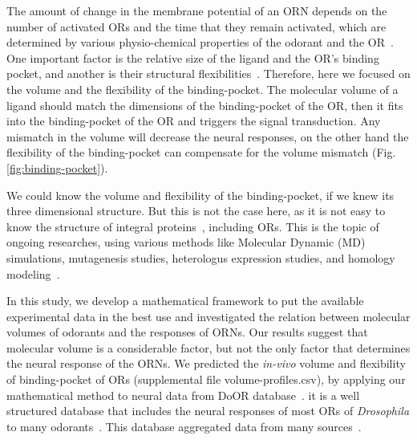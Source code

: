 \documentclass[11pt]{paper} %
\begin{document}

The amount of change in the membrane potential of an ORN depends on the number of activated ORs and the time that they remain activated,
which are determined by various physio-chemical properties of the odorant and the OR~\cite{Turin,Araneda2000,Gabler2013,guerrieri2005,uchida2000}.
One important factor is the relative size of the ligand and the OR's binding pocket, 
and another is their structural flexibilities~\cite{liang1998anatomy,apostolakis1998docking,gunasekaran2007different}. 
Therefore, here we focused on the volume and the flexibility of the binding-pocket.
The molecular volume of a ligand should match the dimensions of the binding-pocket of the OR,
then it fits into the binding-pocket of the OR and triggers the signal transduction. 
Any mismatch in the volume will decrease the neural responses, 
on the other hand the flexibility of the binding-pocket can compensate for the volume mismatch (Fig. \ref{fig:binding-pocket}).

We could know the volume and flexibility of the binding-pocket, 
if we knew its three dimensional structure.
But this is not the case here, 
as it is not easy to know the structure of integral proteins~\cite{Zhang2008,Lupieri2009}, 
including ORs. 
This is the topic of ongoing researches, 
using various methods like Molecular Dynamic (MD) simulations, 
mutagenesis studies, heterologus expression studies, and homology modeling~\cite{Khafizov2007,Man2004,Lai2005,Vaidehi2002,Floriano2004,Schmiedeberg2007,Katada2005,Kato2008,Rospars2013}.

In this study, 
we develop a mathematical framework to put the available experimental data in the best use and
investigated the relation between molecular volumes of odorants and the responses of ORNs. 
Our results suggest that molecular volume is a considerable factor, 
but not the only factor that determines the neural response of the ORNs.
We predicted the {\it in-vivo} volume and flexibility of binding-pocket of ORs (supplemental file volume-profiles.csv), 
by applying our mathematical method to neural data from DoOR database~\cite{Galizia2010}. 
it is a well structured database that includes the neural responses of most ORs of \textit{Drosophila} to many odorants~\cite{Galizia2010}. 
This database aggregated data from many sources~\cite{Bruyne1999,Bruyne2001,Dobritsa2003,Goldman2005,Hallem2004,Hallem2006,
Kreher2005,Kreher2008,Kwon2007,Pelz2006,Pelz2006,Schmuker2007,Stensmyr2003,
Turner2009,VanderGoesvanNaters2007,Yao2005}.
\end{document}
